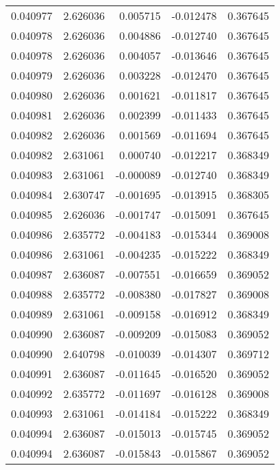 \begin{tabular}{lrrrr}
0.040977    &  2.626036 &  0.005715 & -0.012478 &             0.367645 \\
0.040978    &  2.626036 &  0.004886 & -0.012740 &             0.367645 \\
0.040978    &  2.626036 &  0.004057 & -0.013646 &             0.367645 \\
0.040979    &  2.626036 &  0.003228 & -0.012470 &             0.367645 \\
0.040980    &  2.626036 &  0.001621 & -0.011817 &             0.367645 \\
0.040981    &  2.626036 &  0.002399 & -0.011433 &             0.367645 \\
0.040982    &  2.626036 &  0.001569 & -0.011694 &             0.367645 \\
0.040982    &  2.631061 &  0.000740 & -0.012217 &             0.368349 \\
0.040983    &  2.631061 & -0.000089 & -0.012740 &             0.368349 \\
0.040984    &  2.630747 & -0.001695 & -0.013915 &             0.368305 \\
0.040985    &  2.626036 & -0.001747 & -0.015091 &             0.367645 \\
0.040986    &  2.635772 & -0.004183 & -0.015344 &             0.369008 \\
0.040986    &  2.631061 & -0.004235 & -0.015222 &             0.368349 \\
0.040987    &  2.636087 & -0.007551 & -0.016659 &             0.369052 \\
0.040988    &  2.635772 & -0.008380 & -0.017827 &             0.369008 \\
0.040989    &  2.631061 & -0.009158 & -0.016912 &             0.368349 \\
0.040990    &  2.636087 & -0.009209 & -0.015083 &             0.369052 \\
0.040990    &  2.640798 & -0.010039 & -0.014307 &             0.369712 \\
0.040991    &  2.636087 & -0.011645 & -0.016520 &             0.369052 \\
0.040992    &  2.635772 & -0.011697 & -0.016128 &             0.369008 \\
0.040993    &  2.631061 & -0.014184 & -0.015222 &             0.368349 \\
0.040994    &  2.636087 & -0.015013 & -0.015745 &             0.369052 \\
0.040994    &  2.636087 & -0.015843 & -0.015867 &             0.369052 \\

\end{tabular}
